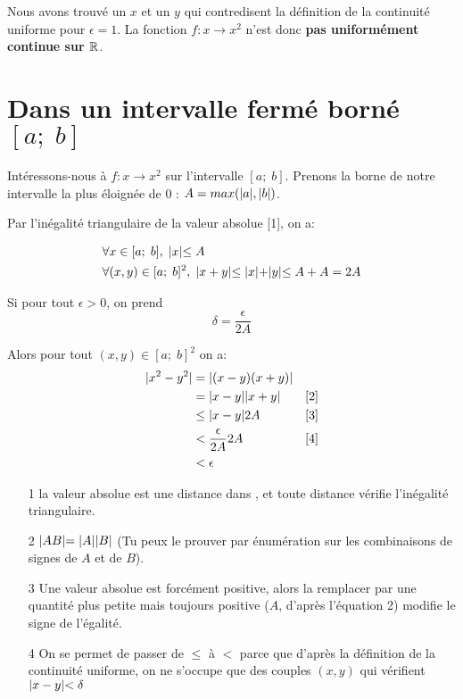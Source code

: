 \documentclass[a4paper, 14pt]{article}
\begin{document}
Nous avons trouvé un $x$ et un $y$ qui contredisent la définition de la
continuité uniforme pour $\epsilon = 1$. La fonction $f : x \to x^2$ n'est donc
\textbf{pas uniformément continue sur $\mathbb{R}$}.

\section{Dans un intervalle fermé borné $\left[a;\;b\right]$}

Intéressons-nous à $f : x \to x^2$ sur l'intervalle $\left[a;\;b\right]$.
Prenons la borne de notre intervalle la plus
éloignée de $0$ : $A = max(\lvert a \lvert, \lvert b \lvert)$.

Par l'inégalité triangulaire de la valeur absolue [1], on a:

\begin{align}
  &\forall x \in [a;\;b], \; \lvert x \lvert \le A\\
  &\forall (x, y) \in [a;\;b]^2, \; \lvert x + y \lvert \le \lvert x \lvert + \lvert y \lvert \le A+A = 2A
\end{align}

Si pour tout $\epsilon > 0$, on prend
\[
  \delta = \frac{\epsilon}{2A}
\]

Alors pour tout $(x, y) \in [a;\;b]^2$ on a:
\begin{align*}
  \lvert x^2 - y^2 \lvert &= \lvert (x - y)(x + y) \lvert&\\
                  &= \lvert x-y \lvert\lvert x+y \lvert&[2]\\
                  &\le \lvert x-y \lvert2A &[3]\\
                  &< \frac{\epsilon}{2A}2A &[4]\\
                  &< \epsilon
\end{align*}

\bigskip


\bigskip
\begin{itemize}
  \item[1] la valeur absolue est une distance dans \R, et toute distance vérifie
    l'inégalité triangulaire.
  \item[2] $\lvert AB \lvert = \lvert A \lvert\lvert B \lvert$ (Tu peux le prouver par énumération
    sur les combinaisons de signes de $A$ et de $B$).
  \item[3] Une valeur absolue est forcément positive, alors la remplacer par
    une quantité plus petite mais toujours positive ($A$, d'après l'équation 2)
    modifie le signe de l'égalité.
  \item[4] On se permet de passer de $\le$ à $<$ parce que d'après la
    définition de la continuité uniforme, on ne s'occupe que des couples $(x,y)$ qui
    vérifient $\lvert x - y \lvert < \delta$
\end{itemize}
\end{document}
